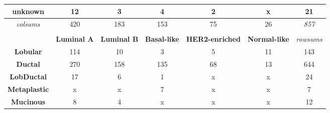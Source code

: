 \begin{table}[!h]
\begin{tabular}{ccccccc}
                \multicolumn{1}{c|}{\textbf{unknown}} & \multicolumn{1}{c|}{12} & \multicolumn{1}{c|}{3} & \multicolumn{1}{c|}{4} & \multicolumn{1}{c|}{2} & \multicolumn{1}{c|}{{\color[HTML]{C0C0C0} x}} & \multicolumn{1}{c|}{{\color[HTML]{656565} 21}} \\ \hline
                \multicolumn{1}{c|}{{\color[HTML]{9B9B9B} \textit{colsums}}} & \multicolumn{1}{c|}{{\color[HTML]{656565} 420}} & \multicolumn{1}{c|}{{\color[HTML]{656565} 183}} & \multicolumn{1}{c|}{{\color[HTML]{656565} 153}} & \multicolumn{1}{c|}{{\color[HTML]{656565} 75}} & \multicolumn{1}{c|}{{\color[HTML]{656565} 26}} & \multicolumn{1}{c|}{\textit{857}} \\ \cline{2-7} 
                \multicolumn{1}{l}{} & \multicolumn{1}{l}{} & \multicolumn{1}{l}{} & \multicolumn{1}{l}{} & \multicolumn{1}{l}{} & \multicolumn{1}{l}{} & \multicolumn{1}{l}{} \\
                \multicolumn{1}{c|}{} & \multicolumn{1}{c|}{\textbf{Luminal A}} & \multicolumn{1}{c|}{\textbf{Luminal B}} & \multicolumn{1}{c|}{\textbf{Basal-like}} & \multicolumn{1}{c|}{\textbf{HER2-enriched}} & \multicolumn{1}{c|}{\textbf{Normal-like}} & {\color[HTML]{9B9B9B} \textit{rowsums}} \\ \hline
                \multicolumn{1}{c|}{\textbf{Lobular}} & \multicolumn{1}{c|}{114} & \multicolumn{1}{c|}{10} & \multicolumn{1}{c|}{3} & \multicolumn{1}{c|}{5} & \multicolumn{1}{c|}{11} & \multicolumn{1}{c|}{{\color[HTML]{656565} 143}} \\ \hline
                \multicolumn{1}{c|}{\textbf{Ductal}} & \multicolumn{1}{c|}{270} & \multicolumn{1}{c|}{158} & \multicolumn{1}{c|}{135} & \multicolumn{1}{c|}{68} & \multicolumn{1}{c|}{13} & \multicolumn{1}{c|}{{\color[HTML]{656565} 644}} \\ \hline
                \multicolumn{1}{c|}{{\color[HTML]{000000} \textbf{LobDuctal}}} & \multicolumn{1}{c|}{17} & \multicolumn{1}{c|}{6} & \multicolumn{1}{c|}{1} & \multicolumn{1}{c|}{{\color[HTML]{C0C0C0} x}} & \multicolumn{1}{c|}{{\color[HTML]{C0C0C0} x}} & \multicolumn{1}{c|}{{\color[HTML]{656565} 24}} \\ \hline
                \multicolumn{1}{c|}{\textbf{Metaplastic}} & \multicolumn{1}{c|}{{\color[HTML]{C0C0C0} x}} & \multicolumn{1}{c|}{{\color[HTML]{C0C0C0} x}} & \multicolumn{1}{c|}{7} & \multicolumn{1}{c|}{{\color[HTML]{C0C0C0} x}} & \multicolumn{1}{c|}{{\color[HTML]{C0C0C0} x}} & \multicolumn{1}{c|}{{\color[HTML]{656565} 7}} \\ \hline
                \multicolumn{1}{c|}{\textbf{Mucinous}} & \multicolumn{1}{c|}{8} & \multicolumn{1}{c|}{4} & \multicolumn{1}{c|}{{\color[HTML]{C0C0C0} x}} & \multicolumn{1}{c|}{{\color[HTML]{C0C0C0} x}} & \multicolumn{1}{c|}{{\color[HTML]{C0C0C0} x}} & \multicolumn{1}{c|}{{\color[HTML]{656565} 12}} \\ \hline

\end{tabular}
\end{table}
